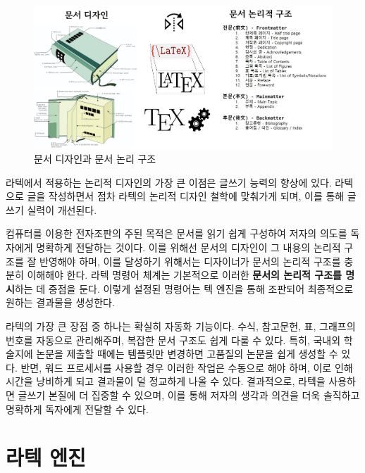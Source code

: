 \documentclass[
  letterpaper,
]{book}
\begin{document}
\begin{figure}

{\centering \includegraphics{images/document-logical-design.jpg}

}

\caption{\label{fig-latex-structure}문서 디자인과 문서 논리 구조}

\end{figure}

라텍에서 적용하는 논리적 디자인의 가장 큰 이점은 글쓰기 능력의 향상에
있다. 라텍으로 글을 작성하면서 점차 라텍의 논리적 디자인 철학에 맞춰가게
되며, 이를 통해 글쓰기 실력이 개선된다.

컴퓨터를 이용한 전자조판의 주된 목적은 문서를 읽기 쉽게 구성하여 저자의
의도를 독자에게 명확하게 전달하는 것이다. 이를 위해선 문서의 디자인이 그
내용의 논리적 구조를 잘 반영해야 하며, 이를 달성하기 위해서는 디자이너가
문서의 논리적 구조를 충분히 이해해야 한다. 라텍 명령어 체계는 기본적으로
이러한 \textbf{문서의 논리적 구조를 명시}하는 데 중점을 둔다. 이렇게
설정된 명령어는 텍 엔진을 통해 조판되어 최종적으로 원하는 결과물을
생성한다.

라텍의 가장 큰 장점 중 하나는 확실히 자동화 기능이다. 수식, 참고문헌,
표, 그래프의 번호를 자동으로 관리해주며, 복잡한 문서 구조도 쉽게 다룰 수
있다. 특히, 국내외 학술지에 논문을 제출할 때에는 템플릿만 변경하면
고품질의 논문을 쉽게 생성할 수 있다. 반면, 워드 프로세서를 사용할 경우
이러한 작업은 수동으로 해야 하며, 이로 인해 시간을 낭비하게 되고
결과물이 덜 정교하게 나올 수 있다. 결과적으로, 라텍을 사용하면 글쓰기
본질에 더 집중할 수 있으며, 이를 통해 저자의 생각과 의견을 더욱 솔직하고
명확하게 독자에게 전달할 수 있다.

\hypertarget{latex-engine}{%
\section{라텍 엔진}\label{latex-engine}}
\end{document}
